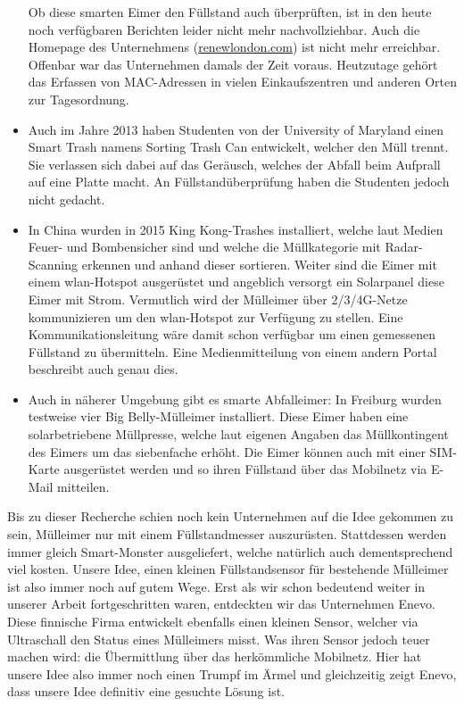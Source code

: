 \begin{itemize}
  Ob diese smarten Eimer den Füllstand auch überprüften, ist in den heute noch verfügbaren Berichten leider nicht mehr nachvollziehbar. Auch die Homepage des Unternehmens (\url{renewlondon.com}) ist nicht mehr erreichbar. Offenbar war das Unternehmen damals der Zeit voraus. Heutzutage gehört das Erfassen von MAC-Adressen in vielen Einkaufszentren und anderen Orten zur Tagesordnung. 
  \item Auch im Jahre 2013 haben Studenten von der University of Maryland einen \glqq{}Smart Trash\grqq{} namens \glqq{}Sorting Trash Can\grqq{}\autocite{market:sortingTrashCan} entwickelt, welcher den Müll trennt. Sie verlassen sich dabei auf das Geräusch, welches der Abfall beim Aufprall auf eine Platte macht. An Füllstandüberprüfung haben die Studenten jedoch nicht gedacht.
  \item In China wurden in 2015 \glqq{}King Kong-Trashes\grqq{}\autocite{market:ChinaTrash} installiert, welche laut Medien Feuer- und Bombensicher sind und welche die Müllkategorie mit Radar-Scanning erkennen und anhand dieser sortieren. Weiter sind die Eimer mit einem \gls{wlan}-Hotspot ausgerüstet und angeblich versorgt ein Solarpanel diese Eimer mit Strom. Vermutlich wird der Mülleimer über 2/3/4G-Netze kommunizieren um den \gls{wlan}-Hotspot zur Verfügung zu stellen. Eine Kommunikationsleitung wäre damit schon verfügbar um einen gemessenen Füllstand zu übermitteln. Eine Medienmitteilung von einem andern Portal beschreibt auch genau dies\autocite{market:ChinaTrash2}.
  
  \item Auch in näherer Umgebung gibt es smarte Abfalleimer: In Freiburg wurden testweise vier \glqq{}Big Belly\grqq{}-Mülleimer installiert\autocite{market:BigBelly}. Diese Eimer haben eine solarbetriebene Müllpresse, welche laut eigenen Angaben das Müllkontingent des Eimers um das siebenfache erhöht. Die Eimer können auch mit einer SIM-Karte ausgerüstet werden und so ihren Füllstand über das Mobilnetz via E-Mail mitteilen.
\end{itemize}

Bis zu dieser Recherche schien noch kein Unternehmen auf die Idee gekommen zu sein, Mülleimer \glqq{}nur\grqq{} mit einem Füllstandmesser auszurüsten. Stattdessen werden immer gleich \glqq{}Smart-Monster\grqq{} ausgeliefert, welche natürlich auch dementsprechend viel kosten. Unsere Idee, einen kleinen Füllstandsensor für bestehende Mülleimer ist also immer noch auf gutem Wege. Erst als wir schon bedeutend weiter in unserer Arbeit fortgeschritten waren, entdeckten wir das Unternehmen Enevo\autocite{market:Enevo}. Diese finnische Firma entwickelt ebenfalls einen kleinen Sensor, welcher via Ultraschall den Status eines Mülleimers misst. Was ihren Sensor jedoch teuer machen wird: die Übermittlung über das herkömmliche Mobilnetz. Hier hat unsere Idee also immer noch einen Trumpf im Ärmel und gleichzeitig zeigt Enevo, dass unsere Idee definitiv eine gesuchte Lösung ist.
\newpage

